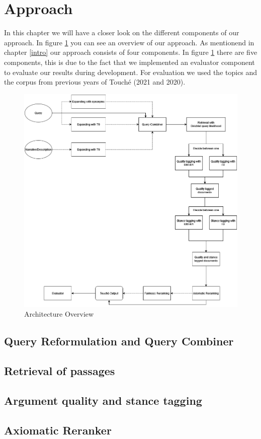 \section{Approach} \label{approach}
    In this chapter we will have a closer look on the different components of our approach. In figure \ref{fig:pipeline} you can see an overview of our approach. As mentionend in chapter \ref{intro} our approach consists of four components. In figure \ref{fig:pipeline} there are five components, this is due to the fact that we implemented an evaluator component to evaluate our results during development. For evaluation we used the topics and the corpus from previous years of Touché (2021 and 2020).

    \begin{figure}[h]
        \centering
        \includegraphics[scale=0.4]{figures/pipeline}
        \caption{Architecture Overview}
        \label{fig:pipeline}
    \end{figure}

    \subsection{Query Reformulation and Query Combiner}
    \subsection{Retrieval of passages}
    \subsection{Argument quality and stance tagging}
    \subsection{Axiomatic Reranker}